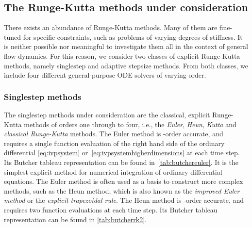 \subsection{The Runge-Kutta methods under consideration}
\label{sub:the_runge_kutta_methods_under_consideration}

There exists an abundance of Runge-Kutta methods. Many of them are
fine-tuned for specific constraints, such as problems of varying degrees of
stiffness. It is neither possible nor meaningful to investigate them all
in the context of general flow dynamics. For this reason, we consider two classes
of explicit Runge-Kutta methods, namely singlestep and adaptive stepsize
methods. From both classes, we include four different general-purpose ODE solvers
of varying order.

\subsubsection{Singlestep methods}
\label{ssub:singlestep_methods}

The singlestep methods under consideration are the classical, explicit
Runge-Kutta methods of orders one through to four, i.e., the \emph{Euler},
\emph{Heun}, \emph{Kutta} and \emph{classical Runge-Kutta} methods. The
Euler method is -order accurate, and requires a single function
evaluation of the right hand side of the ordinary differential
\cref{eq:ivpsystem} or~\eqref{eq:ivpsystemhigherdimensions} at each time step.
Its Butcher tableau representation can be found in~\cref{tab:butchereuler}.
It is the simplest explicit method for numerical integration of ordinary
differential equations. The Euler method is often used as a basis to construct
more complex methods, such as the Heun method, which is also known as the
\emph{improved Euler method} or the \emph{explicit trapezoidal rule}. The Heun
method is -order accurate, and requires two function evaluations at each
time step. Its Butcher tableau representation can be found in
\cref{tab:butcherrk2}.


\clearpage


